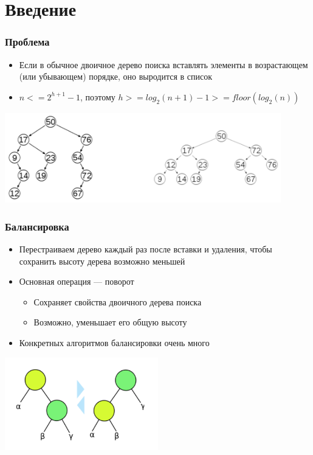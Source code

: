\documentclass{../../slides-style}
\begin{document}
    \begin{frame}[plain]
        \titlepage
    \end{frame}

    \section{Введение}

    \begin{frame}
        \frametitle{Проблема}
        \begin{itemize}
            \item Если в обычное двоичное дерево поиска вставлять элементы в возрастающем (или убывающем) порядке, оно выродится в список
            \item $n <= 2^{h + 1} - 1$, поэтому $h >= log_2(n + 1) - 1 >= floor(log_2(n))$
        \end{itemize}
        \begin{center}
            \includegraphics[width=0.9\textwidth]{tree-problem.png}
        \end{center}
    \end{frame}

    \begin{frame}
        \frametitle{Балансировка}
        \begin{itemize}
            \item Перестраиваем дерево каждый раз после вставки и удаления, чтобы сохранить высоту дерева возможно меньшей
            \item Основная операция --- поворот
            \begin{itemize}
                \item Сохраняет свойства двоичного дерева поиска
                \item Возможно, уменьшает его общую высоту
            \end{itemize}
            \item Конкретных алгоритмов балансировки очень много
        \end{itemize}
        \begin{center}
            \includegraphics[width=0.5\textwidth]{balancing.png}
        \end{center}
    \end{frame}
\end{document}

